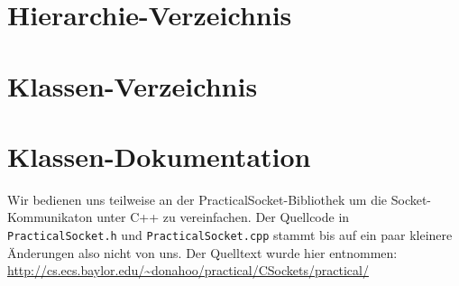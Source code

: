 \documentclass[fontsize = 12pt, paper = a4]{scrreprt}
\begin{document}
\chapter{Hierarchie-\/\-Verzeichnis}

\chapter{Klassen-\/\-Verzeichnis}

\chapter{Klassen-\/\-Dokumentation}
 
Wir bedienen uns teilweise an der PracticalSocket-Bibliothek um die Socket-Kommunikaton unter C++ zu vereinfachen. Der Quellcode in \texttt{PracticalSocket.h} und \texttt{PracticalSocket.cpp} stammt bis auf ein paar kleinere Änderungen also nicht von uns. Der Quelltext wurde hier entnommen: \url{http://cs.ecs.baylor.edu/~donahoo/practical/CSockets/practical/}
 















 
\newpage
{}
{}
\printindex
 
\end{document}
